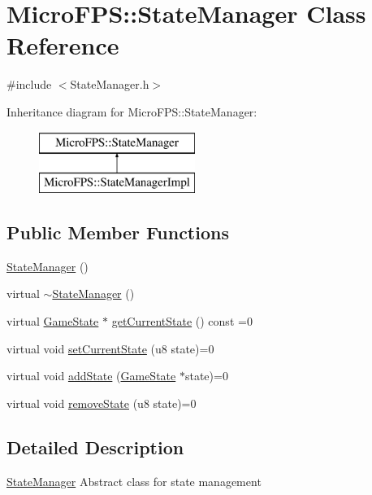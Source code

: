 \hypertarget{class_micro_f_p_s_1_1_state_manager}{
\section{MicroFPS::StateManager Class Reference}
\label{d2/dbd/class_micro_f_p_s_1_1_state_manager}
}


{\ttfamily \#include $<$StateManager.h$>$}

Inheritance diagram for MicroFPS::StateManager:\begin{figure}[H]
\begin{center}
\leavevmode
\includegraphics[height=2.000000cm]{d2/dbd/class_micro_f_p_s_1_1_state_manager}
\end{center}
\end{figure}
\subsection*{Public Member Functions}
\begin{DoxyCompactItemize}
\item 
\hyperlink{class_micro_f_p_s_1_1_state_manager_a05450ac05314e7f0ca504c814809ba32}{StateManager} ()
\item 
virtual \hyperlink{class_micro_f_p_s_1_1_state_manager_ab07b0637b6730764afd561a9cae29b02}{$\sim$StateManager} ()
\item 
virtual \hyperlink{class_micro_f_p_s_1_1_game_state}{GameState} $\ast$ \hyperlink{class_micro_f_p_s_1_1_state_manager_ac7399e6e56923dd9b45e3ae1169b55f7}{getCurrentState} () const =0
\item 
virtual void \hyperlink{class_micro_f_p_s_1_1_state_manager_af502f97754c3393e570daf5a4401d203}{setCurrentState} (u8 state)=0
\item 
virtual void \hyperlink{class_micro_f_p_s_1_1_state_manager_a535cadf882ebf37415d9bcbb7da3ed1a}{addState} (\hyperlink{class_micro_f_p_s_1_1_game_state}{GameState} $\ast$state)=0
\item 
virtual void \hyperlink{class_micro_f_p_s_1_1_state_manager_a66e7e2d3e4cd83feec9afff7e9c157a0}{removeState} (u8 state)=0
\end{DoxyCompactItemize}


\subsection{Detailed Description}
\hyperlink{class_micro_f_p_s_1_1_state_manager}{StateManager} Abstract class for state management 

